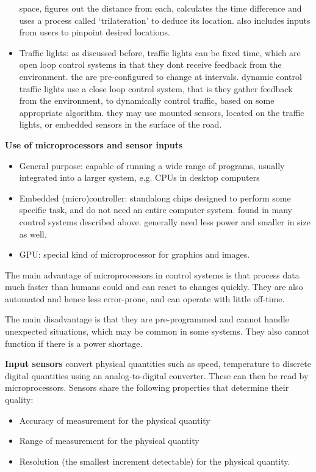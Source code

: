 \documentclass{article}
\begin{document}
\begin{itemize}
        space, figures out the distance from each, calculates the time
        difference and uses a process called `trilateration' to deduce its
        location. also includes inputs from users to pinpoint desired
        locations.
    \item Traffic lights: as discussed before, traffic lights can be
        fixed time, which are open loop control systems in that they dont
        receive feedback from the environment. the are pre-configured to change
        at intervals. dynamic control traffic lights use a close loop control
        system, that is they gather feedback from the environment, to
        dynamically control traffic, based on some appropriate algorithm. they
        may use mounted sensors, located on the traffic lights, or embedded
        sensors in the surface of the road.
\end{itemize}

\textbf{Use of microprocessors and sensor inputs} \\
\begin{itemize}
    \item General purpose: capable of running a wide range of programs, usually
        integrated into a larger system, e.g. CPUs in desktop computers
    \item Embedded (micro)controller: standalong chips designed to perform some
        specific task, and do not need an entire computer system. found in many
        control systems described above. generally need less power and smaller
        in size as well.
    \item GPU: special kind of microprocessor for graphics and images.
\end{itemize}

The main advantage of microprocessors in control systems is that process data
much faster than humans could and can react to changes quickly. They are also
automated and hence less error-prone, and can operate with little off-time.

The main disadvantage is that they are pre-programmed and cannot handle
unexpected situations, which may be common in some systems. They also cannot
function if there is a power shortage.

\textbf{Input sensors} convert physical quantities such as speed, temperature
to discrete digital quantities using an analog-to-digital converter. These can
then be read by microprocessors. Sensors share the following properties that
determine their quality:
\begin{itemize}
    \item Accuracy of measurement for the physical quantity
    \item Range of measurement for the physical quantity
    \item Resolution (the smallest increment detectable) for the physical
        quantity.
\end{itemize}
\end{document}
